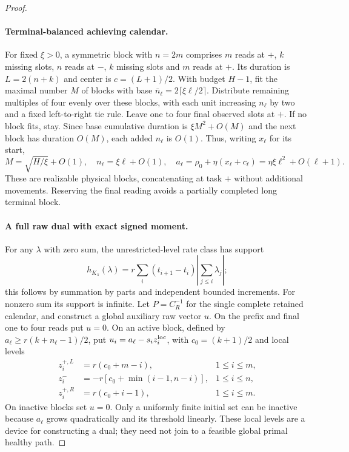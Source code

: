 \begin{proof}
\paragraph{Terminal-balanced achieving calendar.}
For fixed $\xi>0$, a symmetric block with $n=2m$ comprises $m$ reads at
$+$, $k$ missing slots, $n$ reads at $-$, $k$ missing slots and $m$ reads at
$+$. Its duration is $L=2(n+k)$ and center is $c=(L+1)/2$.
With budget $H-1$, fit the maximal number $M$ of blocks with base
$\bar n_\ell=2\lceil\xi\ell/2\rceil$. Distribute remaining multiples of four
evenly over these blocks, with each unit increasing $n_\ell$ by two and a
fixed left-to-right tie rule. Leave one to four final observed slots at $+$.
If no block fits, stay. Since base cumulative duration is $\xi M^2+O(M)$
and the next block has duration $O(M)$, each added $n_\ell$ is $O(1)$.
Thus, writing $x_\ell$ for its start,
\begin{equation}\label{eq:ar1-block-scales}
 M=\sqrt{H/\xi}+O(1),\quad n_\ell=\xi\ell+O(1),\quad
 a_\ell=\rho_0+\eta(x_\ell+c_\ell)=\eta\xi\ell^2+O(\ell+1).
\end{equation}
These are realizable physical blocks, concatenating at task $+$ without
additional movements. Reserving the final reading avoids a partially
completed long terminal block.

\paragraph{A full raw dual with exact signed moment.}
For any $\lambda$ with zero sum, the unrestricted-level rate class has support
\begin{equation}\label{eq:ar1-support}
 h_{K_\pi}(\lambda)=r\sum_i(t_{i+1}-t_i)
 \left|\sum_{j\le i}\lambda_j\right|;
\end{equation}
this follows by summation by parts and independent bounded increments.
For nonzero sum its support is infinite.
Let $P=C_R^{-1}$ for the single complete retained calendar, and construct a
global auxiliary raw vector $u$. On the prefix and final one to four reads
put $u=0$. On an active block, defined by
$a_\ell\ge r(k+n_\ell-1)/2$, put $u_i=a_\ell-s_i z_i^{\rm loc}$, with
$c_0=(k+1)/2$ and local levels
\begin{align}\label{eq:ar1-local-levels}
 z_i^{+,L}&=r(c_0+m-i),&1\le i\le m,\nonumber\\
 z_i^-&=-r[c_0+\min(i-1,n-i)],&1\le i\le n,\\
 z_i^{+,R}&=r(c_0+i-1),&1\le i\le m.\nonumber
\end{align}
On inactive blocks set $u=0$. Only a uniformly finite initial set can be
inactive because $a_\ell$ grows quadratically and its threshold linearly.
These local levels are a device for constructing a dual; they need not join
to a feasible global primal healthy path.


\end{proof}
